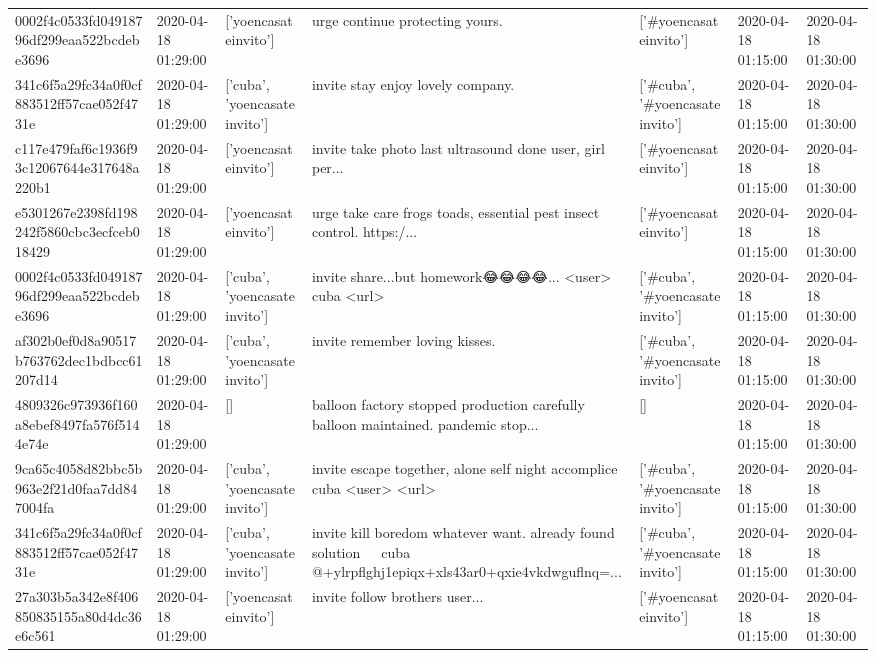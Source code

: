 \begin{tabular}{lllllll}
0002f4c0533fd04918796df299eaa522bcdebe3696 & 2020-04-18 01:29:00 & ['yoencasateinvito'] & urge continue protecting yours. & ['#yoencasateinvito'] & 2020-04-18 01:15:00 & 2020-04-18 01:30:00 \\
341c6f5a29fc34a0f0cf883512ff57cae052f4731e & 2020-04-18 01:29:00 & ['cuba', 'yoencasateinvito'] & invite stay enjoy lovely company. & ['#cuba', '#yoencasateinvito'] & 2020-04-18 01:15:00 & 2020-04-18 01:30:00 \\
c117e479faf6c1936f93c12067644e317648a220b1 & 2020-04-18 01:29:00 & ['yoencasateinvito'] & invite take photo last ultrasound done user, girl per... & ['#yoencasateinvito'] & 2020-04-18 01:15:00 & 2020-04-18 01:30:00 \\
e5301267e2398fd198242f5860cbc3ecfceb018429 & 2020-04-18 01:29:00 & ['yoencasateinvito'] & urge take care frogs toads, essential pest insect control. https:/... & ['#yoencasateinvito'] & 2020-04-18 01:15:00 & 2020-04-18 01:30:00 \\
0002f4c0533fd04918796df299eaa522bcdebe3696 & 2020-04-18 01:29:00 & ['cuba', 'yoencasateinvito'] & invite share...but homework😂😂😂😂... <user> cuba <url> & ['#cuba', '#yoencasateinvito'] & 2020-04-18 01:15:00 & 2020-04-18 01:30:00 \\
af302b0ef0d8a90517b763762dec1bdbcc61207d14 & 2020-04-18 01:29:00 & ['cuba', 'yoencasateinvito'] & invite remember loving kisses. & ['#cuba', '#yoencasateinvito'] & 2020-04-18 01:15:00 & 2020-04-18 01:30:00 \\
4809326c973936f160a8ebef8497fa576f5144e74e & 2020-04-18 01:29:00 & [] & balloon factory stopped production carefully balloon maintained. pandemic stop... & [] & 2020-04-18 01:15:00 & 2020-04-18 01:30:00 \\
9ca65c4058d82bbc5b963e2f21d0faa7dd847004fa & 2020-04-18 01:29:00 & ['cuba', 'yoencasateinvito'] & invite escape together, alone self night accomplice cuba <user> <url> & ['#cuba', '#yoencasateinvito'] & 2020-04-18 01:15:00 & 2020-04-18 01:30:00 \\
341c6f5a29fc34a0f0cf883512ff57cae052f4731e & 2020-04-18 01:29:00 & ['cuba', 'yoencasateinvito'] & invite kill boredom whatever want. already found solution 🤣🤣🤣 cuba @+ylrpflghj1epiqx+xls43ar0+qxie4vkdwguflnq=... & ['#cuba', '#yoencasateinvito'] & 2020-04-18 01:15:00 & 2020-04-18 01:30:00 \\
27a303b5a342e8f406850835155a80d4dc36e6c561 & 2020-04-18 01:29:00 & ['yoencasateinvito'] & invite follow brothers user... & ['#yoencasateinvito'] & 2020-04-18 01:15:00 & 2020-04-18 01:30:00 \\

\end{tabular}
